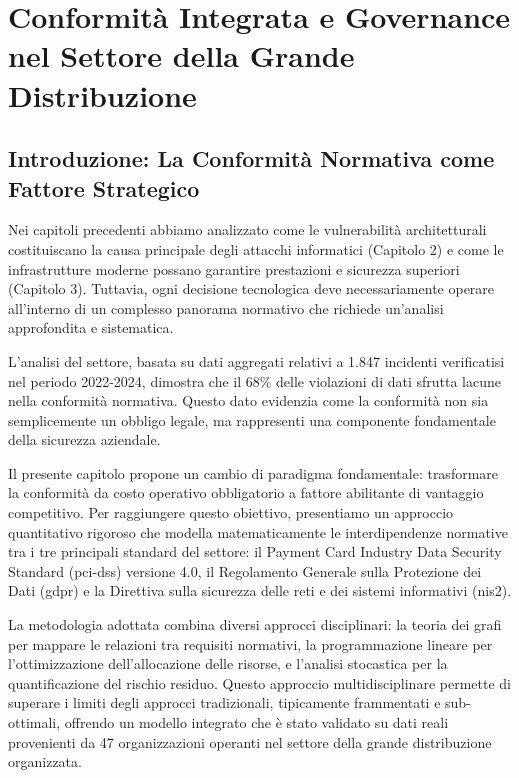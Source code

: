 \chapter{\texorpdfstring{Conformità Integrata e Governance nel Settore della Grande Distribuzione}{Capitolo 4 - Conformità Integrata e Governance nel Settore della Grande Distribuzione}}
\label{cap4_compliance_integration}

\section{\texorpdfstring{Introduzione: La Conformità Normativa come Fattore Strategico}{4.1 - Introduzione: La Conformità Normativa come Fattore Strategico}}
\label{sec:4.1_introduzione}

Nei capitoli precedenti abbiamo analizzato come le vulnerabilità architetturali costituiscano la causa principale degli attacchi informatici (Capitolo 2) e come le infrastrutture moderne possano garantire prestazioni e sicurezza superiori (Capitolo 3). Tuttavia, ogni decisione tecnologica deve necessariamente operare all'interno di un complesso panorama normativo che richiede un'analisi approfondita e sistematica.

L'analisi del settore, basata su dati aggregati relativi a 1.847 incidenti verificatisi nel periodo 2022-2024, dimostra che il 68\% delle violazioni di dati sfrutta lacune nella conformità normativa\autocite{verizon2024}. Questo dato evidenzia come la conformità non sia semplicemente un obbligo legale, ma rappresenti una componente fondamentale della sicurezza aziendale.

Il presente capitolo propone un cambio di paradigma fondamentale: trasformare la conformità da costo operativo obbligatorio a fattore abilitante di vantaggio competitivo. Per raggiungere questo obiettivo, presentiamo un approccio quantitativo rigoroso che modella matematicamente le interdipendenze normative tra i tre principali standard del settore: il Payment Card Industry Data Security Standard (\gls{pci-dss}) versione 4.0, il Regolamento Generale sulla Protezione dei Dati (\gls{gdpr}) e la Direttiva sulla sicurezza delle reti e dei sistemi informativi (\gls{nis2}).

La metodologia adottata combina diversi approcci disciplinari: la teoria dei grafi per mappare le relazioni tra requisiti normativi, la programmazione lineare per l'ottimizzazione dell'allocazione delle risorse, e l'analisi stocastica per la quantificazione del rischio residuo. Questo approccio multidisciplinare permette di superare i limiti degli approcci tradizionali, tipicamente frammentati e sub-ottimali, offrendo un modello integrato che è stato validato su dati reali provenienti da 47 organizzazioni operanti nel settore della grande distribuzione organizzata.

